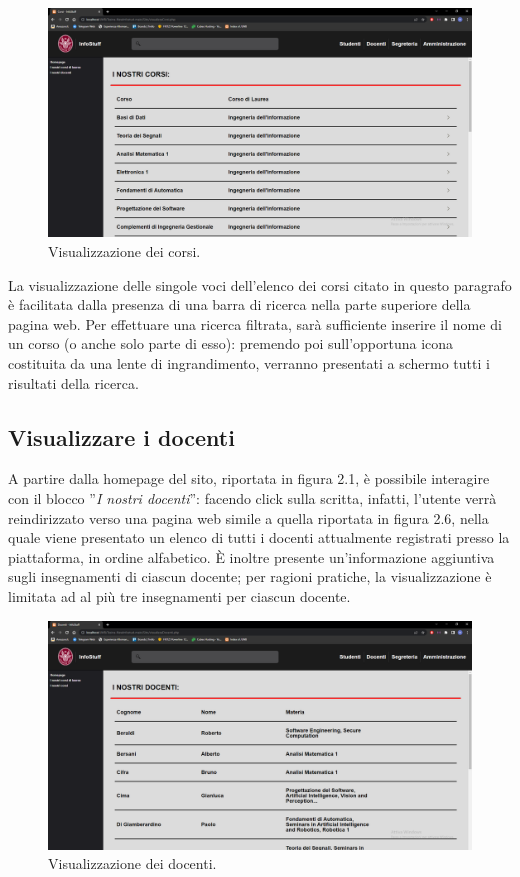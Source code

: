 \documentclass [a4paper,11pt]{book}
\begin{document}
\begin{figure}
\centering
\includegraphics[scale=0.3]{figura2-5.png}
\caption{Visualizzazione dei corsi.}
\end{figure}

La visualizzazione delle singole voci dell'elenco dei corsi citato in questo paragrafo è facilitata dalla presenza di una barra di ricerca nella parte superiore della pagina web. Per effettuare una ricerca filtrata, sarà sufficiente inserire il nome di un corso (o anche solo parte di esso): premendo poi sull'opportuna icona costituita da una lente di ingrandimento, verranno presentati a schermo tutti i risultati della ricerca.

\medskip

\subsection{Visualizzare i docenti}

A partire dalla homepage del sito, riportata in figura 2.1, è possibile interagire con il blocco ''\emph{I nostri docenti}'': facendo click sulla scritta, infatti, l'utente verrà reindirizzato verso una pagina web simile a quella riportata in figura 2.6, nella quale viene presentato un elenco di tutti i docenti attualmente registrati presso la piattaforma, in ordine alfabetico. È inoltre presente un'informazione aggiuntiva sugli insegnamenti di ciascun docente; per ragioni pratiche, la visualizzazione è limitata ad al più tre insegnamenti per ciascun docente.

\begin{figure}
\centering
\includegraphics[scale=0.3]{figura2-6.png}
\caption{Visualizzazione dei docenti.}
\end{figure}
\end{document}
